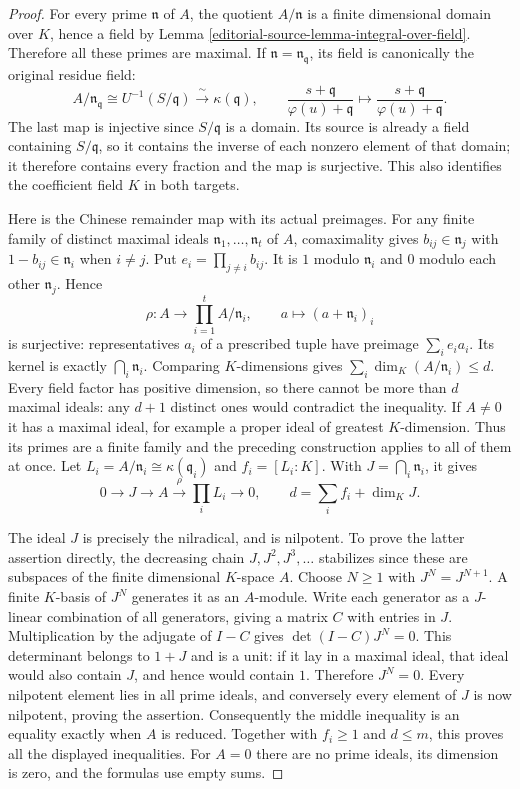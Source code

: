 \begin{proof}
For every prime $\mathfrak n$ of $A$, the quotient $A/\mathfrak n$
is a finite dimensional domain over $K$, hence a field by
Lemma \ref{editorial-source-lemma-integral-over-field}. Therefore all these primes
are maximal. If $\mathfrak n=\mathfrak n_{\mathfrak q}$,
its field is canonically the original residue field:
$$
A/\mathfrak n_{\mathfrak q}
\cong U^{-1}(S/\mathfrak q)
\xrightarrow{\ \sim\ }\kappa(\mathfrak q),\qquad
\frac{s+\mathfrak q}{\varphi(u)+\mathfrak q}
\longmapsto\frac{s+\mathfrak q}{\varphi(u)+\mathfrak q}.
$$
The last map is injective since $S/\mathfrak q$ is a domain.
Its source is already a field containing $S/\mathfrak q$,
so it contains the inverse of each nonzero element of that domain;
it therefore contains every fraction and the map is surjective.
This also identifies the coefficient field $K$ in both targets.

Here is the Chinese remainder map with its actual preimages.
For any finite family of distinct maximal ideals
$\mathfrak n_1,\ldots,\mathfrak n_t$ of $A$, comaximality gives
$b_{ij}\in\mathfrak n_j$ with $1-b_{ij}\in\mathfrak n_i$
when $i\ne j$. Put $e_i=\prod_{j\ne i}b_{ij}$.
It is $1$ modulo $\mathfrak n_i$ and $0$ modulo each other
$\mathfrak n_j$. Hence
$$
\rho:A\longrightarrow\prod_{i=1}^t A/\mathfrak n_i,
\qquad a\longmapsto(a+\mathfrak n_i)_i
$$
is surjective: representatives $a_i$ of a prescribed tuple have
preimage $\sum_i e_ia_i$. Its kernel is exactly
$\bigcap_i\mathfrak n_i$. Comparing $K$-dimensions gives
$\sum_i\dim_K(A/\mathfrak n_i)\leq d$. Every field factor has
positive dimension, so there cannot be more than $d$ maximal
ideals: any $d+1$ distinct ones would contradict the inequality.
If $A\ne0$ it has a maximal ideal, for example a proper ideal of
greatest $K$-dimension. Thus its primes are a finite family and
the preceding construction applies to all of them at once.
Let $L_i=A/\mathfrak n_i\cong\kappa(\mathfrak q_i)$ and
$f_i=[L_i:K]$. With $J=\bigcap_i\mathfrak n_i$, it gives
$$
0\longrightarrow J\longrightarrow A\xrightarrow{\rho}
\prod_iL_i\longrightarrow0,
\qquad
d=\sum_i f_i+\dim_KJ.
$$

The ideal $J$ is precisely the nilradical, and is nilpotent.
To prove the latter assertion directly, the decreasing chain
$J,J^2,J^3,\ldots$ stabilizes since these are subspaces of the
finite dimensional $K$-space $A$. Choose $N\geq1$ with
$J^N=J^{N+1}$. A finite $K$-basis of $J^N$ generates it as an
$A$-module. Write each generator as a $J$-linear combination
of all generators, giving a matrix $C$ with entries in $J$.
Multiplication by the adjugate of $I-C$ gives
$\det(I-C)J^N=0$. This determinant belongs to $1+J$ and is a
unit: if it lay in a maximal ideal, that ideal would also contain
$J$, and hence would contain $1$. Therefore $J^N=0$.
Every nilpotent element lies in all prime ideals, and conversely
every element of $J$ is now nilpotent, proving the assertion.
Consequently the middle inequality is an equality exactly when
$A$ is reduced. Together with $f_i\geq1$ and $d\leq m$, this
proves all the displayed inequalities. For $A=0$ there are no
prime ideals, its dimension is zero, and the formulas use empty sums.


\end{proof}
